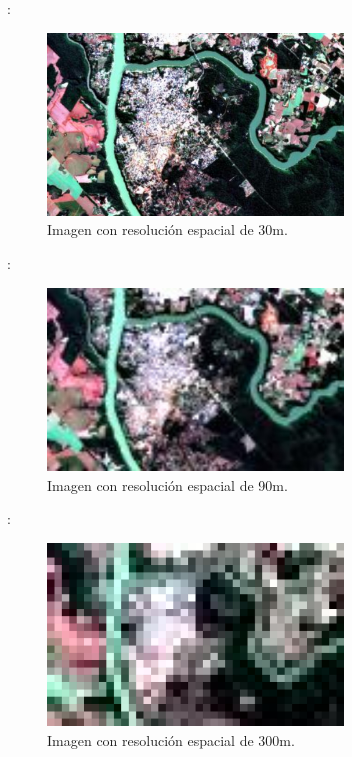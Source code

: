 \documentclass[aspectratio=169]{beamer}
\begin{document}
\begin{frame}{\secname : \subsecname}
    \begin{figure}[h!]
        \centering
        \includegraphics[width=0.7\textwidth]{fig:30m.jpg}
        \caption{Imagen con resolución espacial de 30m.}
    \end{figure}
\end{frame}

\begin{frame}{\secname : \subsecname}
    \begin{figure}[h!]
        \centering
        \includegraphics[width=0.7\textwidth]{fig:90m.jpg}
        \caption{Imagen con resolución espacial de 90m.}
    \end{figure}
\end{frame}

\begin{frame}{\secname : \subsecname}
    \begin{figure}[h!]
        \centering
        \includegraphics[width=0.7\textwidth]{fig:300m.jpg}
        \caption{Imagen con resolución espacial de 300m.}
    \end{figure}
\end{frame}
\end{document}
